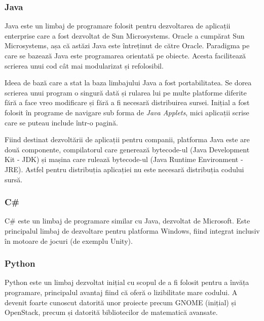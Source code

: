 \subsubsection{Java}
\label{sec:appdev:hybrid-lang:java}

Java este un limbaj de programare folosit pentru dezvoltarea de aplicații enterprise care a fost dezvoltat de Sun Microsystems.
Oracle a cumpărat Sun Microsystems, așa că astăzi Java este întreținut de către Oracle.
Paradigma pe care se bazează Java este programarea orientată pe obiecte.
Acesta facilitează scrierea unui cod cât mai modularizat și refolosibil.

Ideea de bază care a stat la baza limbajului Java a fost portabilitatea.
Se dorea scrierea unui program o singură dată și rularea lui pe multe platforme diferite fără a face vreo modificare și fără a fi necesară distribuirea sursei.
Inițial a fost folosit în programe de navigare sub forma de \textit{Java Applets}, mici aplicații scrise care se puteau include într-o pagină.

Fiind destinat dezvoltării de aplicații pentru companii, platforma Java este are două componente, compilatorul care generează bytecode-ul (Java Development Kit - JDK) și mașina care rulează bytecode-ul (Java Runtime Environment - JRE).
Astfel pentru distribuția aplicației nu este necesară distribuția codului sursă.

\subsubsection{C\#}
\label{sec:appdev:hybrid-lang:csharp}

C\# este un limbaj de programare similar cu Java, dezvoltat de Microsoft.
Este principalul limbaj de dezvoltare pentru platforma Windows, fiind integrat inclusiv în motoare de jocuri (de exemplu Unity).

\subsubsection{Python}
\label{sec:appdev:hybrid-lang:python}

Python este un limbaj dezvoltat inițial cu scopul de a fi folosit pentru a învăța programare, principalul avantaj fiind că oferă o lizibilitate mare codului.
A devenit foarte cunoscut datorită unor proiecte precum GNOME (inițial) și OpenStack, precum și datorită bibliotecilor de matematică avansate.

